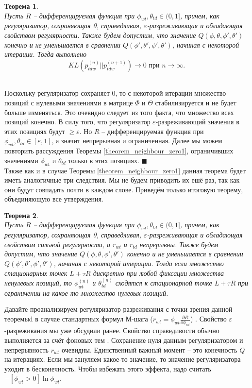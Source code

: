 \documentclass[12pt]{article}
\newtheorem{theorem}{Теорема}
\newenvironment{Proof} 
	{\par\noindent{\bf Доказательство.}} 
	{\hfill$\blacksquare$}
\renewcommand{\geq}{\geqslant}
\begin{document}
\begin{theorem} \label{theorem_neighbour_zero2} \ \\
	Пусть $R$ -- дифференцируемая функция при $\phi_{wt}, \theta_{td} \in (0, 1]$, причем, как регуляризатор, сохраняющая 0, справедливая, $\varepsilon$-разреживающая и обладающая свойством регулярности. Также будем допустим,  что значение $Q(\phi, \theta, \phi', \theta')$ конечно и не уменьшается в сравнении $Q(\phi', \theta', \phi', \theta')$, начиная с некоторой итерации. Тогда выполнено
\[
KL(p_{tdw}^{(n)}||p_{tdw}^{(n + 1)}) \to 0 \text{ при } n \to \infty.
\]
\end{theorem}
\begin{Proof}\ \\
Поскольку регуляризатор сохраняет 0, то с некоторой итерации множество позиций с нулевыми значениями в матрице $\Phi$ и $\Theta$ стабилизируется и не будет больше изменяться. Это очевидно следует из того факта, что  множество всех позиций конечно. В силу того, что регуляризатор $\varepsilon$-разреживающий значения в этих позициях будут $\geq \varepsilon$. Но $R$ -- дифференцируемая функция при $\phi_{wt}, \theta_{td} \in [\varepsilon, 1]$, а значит непрерывная и ограниченная. Далее мы можем повторить рассуждения Теоремы \ref{theorem_neighbour_zero1}, ограничивших значениями $\phi_{wt}$ и $\theta_{td}$ только в этих позициях. 
\end{Proof}\ \\
Также как и в случае Теоремы \ref{theorem_neighbour_zero1} данная теорема будет иметь аналогичные три следствия. Мы не будем приводить их ешё раз, так как они будут совпадать почти в каждом слове. Приведём только итоговую теорему, объединяющую все утверждения.
\begin{theorem} \label{theorem_convergence1} \ \\
	Пусть $R$ -- дифференцируемая функция при $\phi_{wt}, \theta_{td} \in (0, 1]$, причем, как регуляризатор, сохраняющая 0, справедливая, $\varepsilon$-разреживающая и обладающая свойством сильной регулярности, а  $r_{wt}$ и $r_{td}$ непрерывны. Также будем допустим,  что значение $Q(\phi, \theta, \phi', \theta')$ конечно и не уменьшается в сравнении $Q(\phi', \theta', \phi', \theta')$, начиная с некоторой итерации. Тогда если множество стационарных точек $L + \tau R$ дискретно при любой фиксации множества ненулевых позиций, то $\phi_{wt}^{(n)}$ и $\theta_{td}^{(n)}$ сходятся к стационарной точке $L + \tau R$ при ограничении на какое-то множество нулевых позиций.
\end{theorem}
Давайте проанализируем регуляризатор разреживания с точки зрения данной теоремыd в случае стандартных формул М-шага ($r_{wt} = \phi_{wt}\frac{\partial{R}}{\partial{\phi_{wt}}}$) . Свойство $\varepsilon$-разреживания мы уже обсудили ранее. Свойство справедивости обычно выполняется за счёт фоновых тем \cite{artmdef2} . Сохранение нуля данным регуляризатором и непрерывность $r_{wt}$ очевидны. Единственный важный момент -- это конечность $Q$ на итерациях. Если мы зануляем какое-то значение, то значение регуляризатора уходит в бесконечность. Чтобы избежать этого эффекта, надо считать $- [\phi_{wt} > 0] \ln\phi_{wt}$.\\
\end{document}
